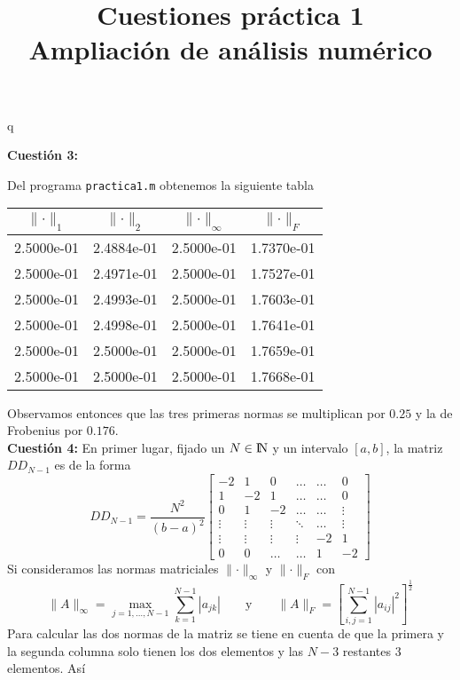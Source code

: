 q\documentclass[12pt]{article}
\title{\textbf{Cuestiones práctica 1\\ {\small Ampliación de análisis numérico}}}
\date{}
\newcommand{\NN}{{\rm I\!N}}
\newcommand{\abs}[1]{\left|#1\right|}
\newcommand{\norm}[1]{\lVert #1\rVert}
\theoremstyle{definition}
\begin{document}
\maketitle

\newpage 
\noindent\textbf{Cuestión 3:}

Del programa \texttt{practica1.m} obtenemos la siguiente tabla
{\Large \begin{center}
		\begin{tabular}{ | c | c | c | c |}
			\hline
			$\norm{\cdot}_1$ & $\norm{\cdot}_2$ & $\norm{\cdot}_\infty$ & $\norm{\cdot}_F$ \\
			\hline\hline
			2.5000e-01 & 2.4884e-01 & 2.5000e-01 & 1.7370e-01 \\
			2.5000e-01 & 2.4971e-01 & 2.5000e-01 & 1.7527e-01 \\
			2.5000e-01 & 2.4993e-01 & 2.5000e-01 & 1.7603e-01 \\
			2.5000e-01 & 2.4998e-01 & 2.5000e-01 & 1.7641e-01 \\
			2.5000e-01 & 2.5000e-01 & 2.5000e-01 & 1.7659e-01 \\
			2.5000e-01 & 2.5000e-01 & 2.5000e-01 & 1.7668e-01 \\
			\hline
		\end{tabular}
\end{center}}
Observamos entonces que las tres primeras normas se multiplican por $0.25$ y la de Frobenius por $0.176$. \\
\newline 
\noindent\textbf{Cuestión 4:} En primer lugar, fijado un $N\in\NN$ y un intervalo $[a,b]$, la matriz $DD_{N-1}$ es de la forma
$$DD_{N-1} = \frac{N^2}{(b-a)^2}\begin{bmatrix}
	-2 & 1 & 0 & \dots & \dots & 0 \\
	1 & -2  & 1 & \dots  & \dots  & 0 \\
	0 & 1 & -2 & \dots & \dots & \vdots \\
	\vdots  & \vdots & \vdots & \ddots & \dots & \vdots \\
	\vdots & \vdots & \vdots & \vdots & -2 & 1 \\
	0 & 0 & \dots & \dots & 1 & -2 
\end{bmatrix}$$
Si consideramos las normas matriciales $\norm{\cdot}_\infty$ y $\norm{\cdot}_F$ con
$$\norm{A}_\infty = \max_{j = 1,\dots, N - 1}\sum_{k=1}^{N-1}\abs{a_{jk}} \quad \quad \text{y} \quad \quad \norm{A}_F = \left[\sum_{i,j=1}^{N-1}\abs{a_{ij}}^2\right]^{\frac{1}{2}}$$
Para calcular las dos normas de la matriz se tiene en cuenta de que la primera y la segunda columna solo tienen los dos elementos y las $N - 3$ restantes 3 elementos. Así
\end{document}
